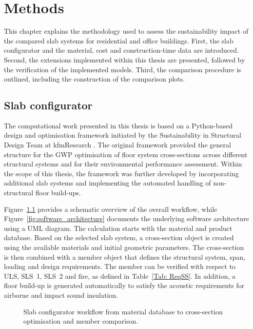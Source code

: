 \chapter{Methods}\label{sec:MM}

This chapter explains the methodology used to assess the sustainability impact of the compared slab systems for residential and office buildings. First, the slab configurator and the material, cost and construction-time data are introduced. Second, the extensions implemented within this thesis are presented, followed by the verification of the implemented models. Third, the comparison procedure is outlined, including the construction of the comparison plots.

\section{Slab configurator}
The computational work presented in this thesis is based on a Python-based design and optimisation framework initiated by the Sustainability in Structural Design Team at kfmResearch \cite{kfmResearch2026}. The original framework provided the general structure for the GWP optimisation of floor system cross-sections across different structural systems and for their environmental performance assessment. Within the scope of this thesis, the framework was further developed by incorporating additional slab systems and implementing the automated handling of non-structural floor build-ups.

Figure~\ref{fig:slab_configurator_workflow} provides a schematic overview of the overall workflow, while Figure~\ref{fig:software_architecture} documents the underlying software architecture using a UML diagram.
The calculation starts with the material and product database. Based on the selected slab system, a cross-section object is created using the available materials and initial geometric parameters. The cross-section is then combined with a member object that defines the structural system, span, loading and design requirements. The member can be verified with respect to ULS, SLS~1, SLS~2 and fire, as defined in Table~\ref{Tab: ReqSS}. In addition, a floor build-up is generated automatically to satisfy the acoustic requirements for airborne and impact sound insulation.\\

\begin{figure}[h]
\centering
 \resizebox{\textwidth}{!}{%
        
    }
\caption{Slab configurator workflow from material database to cross-section optimisation and member comparison.}
\label{fig:slab_configurator_workflow}
\end{figure}

